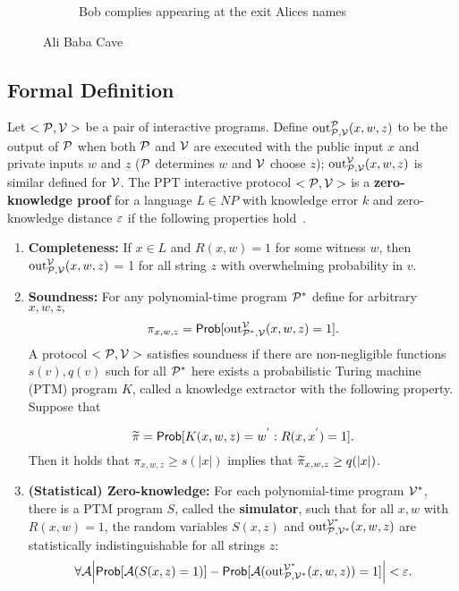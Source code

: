 \begin{figure}[t!]
\begin{subfigure}[t]{0.30\textwidth}
{\begin{tikzpicture}[scale=1]
      \end{tikzpicture}
    }
    \caption{Bob complies appearing at the exit Alices names}
    \label{fig:zkp:alibaba:c}
  \end{subfigure}
  \caption{Ali Baba Cave}
  \label{fig:zkp:alibaba}
\end{figure}

\subsection{Formal Definition}
\label{zkp:definition}

Let $<\calp, \calv>$ be a pair of interactive programs. Define $\text{out}^{\calp}_{\calp, \calv}(x,w,z)$
to be the output of $\calp$ when both $\calp$ and $\calv$ are executed with the public input $x$ and private
inputs $w$ and $z$ ($\calp$ determines $w$ and $\calv$ choose $z$); $\text{out}^{\calv}_{\calp, \calv}(x,w,z)$
is similar defined for $\calv$. The PPT interactive protocol $<\calp, \calv>$ is a \textbf{zero-knowledge proof}
for a language $L \in NP$ with knowledge error $k$ and zero-knowledge distance $\e$ if the following
properties hold~\cite{kiagias:crypto}.

\begin{enumerate}
  \item \textbf{Completeness:} If $x \in L$ and $R(x,w) = 1$ for some witness $w$, then $\text{out}^{\calv}_{\calp, \calv}(x,w,z)$ = 1
    for all string $z$ with overwhelming probability in $v$.
  \item \textbf{Soundness:} For any polynomial-time program $\calp^{*}$ define for arbitrary $x,w,z,$
    \begin{equation*}
      \pi_{x,w,z} = \Prob[\text{out}^{\calv}_{\calp^{*}, \calv}(x,w,z) = 1].
    \end{equation*}
    A protocol $<\calp, \calv>$ satisfies soundness if there are non-negligible functions $s(v), q(v)$ such for all $\calp^{*}$ here exists a probabilistic
    Turing machine (PTM) program $K$, called a knowledge extractor with the following property. Suppose that

    \begin{equation*}
      \widetilde{\pi} = \Prob[K(x,w,z) = w^{'} : R(x, x^{'}) = 1].
    \end{equation*}
    Then it holds that $\pi_{x,w,z} \geq s(|x|)$ implies that $\widetilde{\pi}_{x,w,z} \geq q(\abs{x})$.

  \item \textbf{(Statistical) Zero-knowledge:} For each polynomial-time program $\calv^{*}$, there is a PTM program $S$, called the \textbf{simulator}, such that for all
    $x,w$ with $R(x,w) = 1$, the random variables $S(x,z)$ and $\text{out}^{\calv^{*}}_{\calp, \calv^{*}}(x,w,z)$ are statistically indistinguishable for all strings $z$:
    \begin{equation*}
      \forall \cala \abs[\Big]{\Prob[\cala(S(x,z) = 1)] - \Prob[\cala(\text{out}^{\calv^{*}}_{\calp, \calv^{*}}(x,w,z)) = 1]} < \e.
    \end{equation*}
\end{enumerate}

